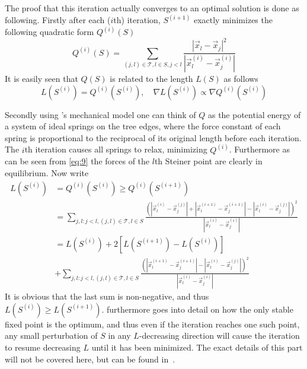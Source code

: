 The proof that this iteration actually converges to an optimal solution is done
as following. Firstly after each ($i$th) iteration, $S^{(i+1)}$ exactly
minimizes the following quadratic form $Q^{(i)}(S)$
%
\begin{equation}
  Q^{(i)}(S) = \sum_{(j,l) \in \mathcal{T}, l \in S, j < l }
  \frac{|\vec x_l - \vec x_j|^2}{|\vec x^{(i)}_l - \vec x^{(i)}_j|}
\end{equation}
%
It is easily seen that $Q(S)$ is related to the length $L(S)$ as follows
%
\begin{equation}
  L(S^{(i)}) = Q^{(i)}(S^{(i)}), \quad \nabla L(S^{(i)}) \propto \nabla Q^{(i)}(S^{(i)})
\end{equation}

Secondly using \textcite{gilbert1968}'s mechanical model one can think of $Q$ as
the potential energy of a system of ideal springs on the tree edges, where the
force constant of each spring is proportional to the reciprocal of its original
length before each iteration. The $i$th iteration causes all springs to relax,
minimizing $Q^{(i)}$. Furthermore as can be seen from \cref{eq:9} the forces of
the $l$th Steiner point are clearly in equilibrium. Now write
%
\begin{align}
  L(S^{(i)}) &= Q^{(i)}(S^{(i)}) \ge Q^{(i)}(S^{(i+1)}) \\
             &= \sum_{j, l : j < l, (j,l) \in \mathcal{T}, l \in S} \frac{{(
               |\vec x_l^{(i)} - \vec x_j^{(j)}| + |\vec x_l^{(i+1)} -
               \vec x_j^{(i+1)}| - |\vec x_l^{(i)} - \vec x_j^{(j)}|)}^2}{
               |\vec x_l^{(i)} - \vec x_j^{(i)}|} \\
             &= L(S^{(i)}) + 2 [ L(S^{(i+1)}) - L(S^{(i)})] \\
             &+ \sum_{j, l : j < l, (j,l) \in \mathcal{T}, l \in S} \frac{{(
               |\vec x_l^{(i+1)} -
               \vec x_j^{(i+1)}| - |\vec x_l^{(i)} - \vec x_j^{(j)}|)}^2}{
               |\vec x_l^{(i)} - \vec x_j^{(i)}|}
\end{align}
%
It is obvious that the last sum is non-negative, and thus
$L(S^{(i)}) \ge L(S^{(i+1)})$. \citeauthor{smith1992} furthermore goes into detail on how the
only stable fixed point is the optimum, and thus even if the iteration reaches
one such point, any small perturbation of $S$ in any $L$-decreasing direction
will cause the iteration to resume decreasing $L$ until it has been
minimized. The exact details of this part will not be covered here, but can be
found in~\cite[p.~147--148]{smith1992}.

